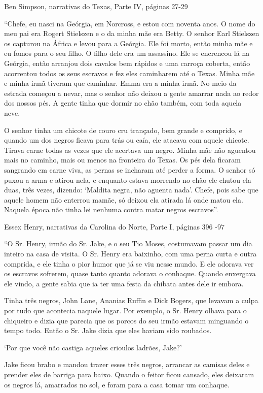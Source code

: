 Ben Simpson, narrativas do Texas, Parte IV, páginas 27-29

``Chefe, eu nasci na Geórgia, em Norcross, e estou com noventa anos. O
nome do meu pai era Rogert Stielszen e o da minha mãe era Betty. O
senhor Earl Stielszen os capturou na África e levou para a Geórgia. Ele
foi morto, então minha mãe e eu fomos para o seu filho. O filho dele era
um assassino. Ele se encrencou lá na Geórgia, então arranjou dois
cavalos bem rápidos e uma carroça coberta, então acorrentou todos os
seus escravos e fez eles caminharem até o Texas. Minha mãe e minha irmã
tiveram que caminhar. Emma era a minha irmã. No meio da estrada começou
a nevar, mas o senhor não deixou a gente amarrar nada ao redor dos
nossos pés. A gente tinha que dormir no chão também, com toda aquela
neve.

O senhor tinha um chicote de couro cru trançado, bem grande e comprido,
e quando um dos negros ficava para trás ou caía, ele atacava com aquele
chicote. Tirava carne todas as vezes que ele acertava um negro. Minha
mãe não aguentou mais no caminho, mais ou menos na fronteira do Texas.
Os pés dela ficaram sangrando em carne viva, as pernas se incharam até
perder a forma. O senhor só puxou a arma e atirou nela, e enquanto
estava morrendo no chão ele chutou ela duas, três vezes, dizendo:
`Maldita negra, não aguenta nada'. Chefe, pois sabe que aquele homem não
enterrou mamãe, só deixou ela atirada lá onde matou ela. Naquela época
não tinha lei nenhuma contra matar negros escravos''.

Essex Henry, narrativas da Carolina do Norte, Parte I, páginas 396 -97

``O Sr. Henry, irmão do Sr. Jake, e o seu Tio Moses, costumavam passar
um dia inteiro na casa de visita. O Sr. Henry era baixinho, com uma
perna curta e outra comprida, e ele tinha o pior humor que já se viu
nesse mundo. E ele adorava ver os escravos sofrerem, quase tanto quanto
adorava o conhaque. Quando enxergava ele vindo, a gente sabia que ia ter
uma festa da chibata antes dele ir embora.

Tinha três negros, John Lane, Ananias Ruffin e Dick Bogers, que levavam
a culpa por tudo que acontecia naquele lugar. Por exemplo, o Sr. Henry
olhava para o chiqueiro e dizia que parecia que os porcos do seu irmão
estavam minguando o tempo todo. Então o Sr. Jake dizia que eles haviam
sido roubados.

`Por que você não castiga aqueles crioulos ladrões, Jake?'

Jake ficou brabo e mandou trazer esses três negros, arrancar as camisas
deles e prender eles de barriga para baixo. Quando o feitor ficou
cansado, eles deixaram os negros lá, amarrados no sol, e foram para a
casa tomar um conhaque.

